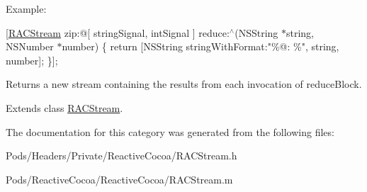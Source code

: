 Example\+:

\mbox{[}\mbox{\hyperlink{interface_r_a_c_stream}{R\+A\+C\+Stream}} zip\+:@\mbox{[} string\+Signal, int\+Signal \mbox{]} reduce\+:$^\wedge$(N\+S\+String $\ast$string, N\+S\+Number $\ast$number) \{ return \mbox{[}N\+S\+String string\+With\+Format\+:"\%@\+: \%", string, number\mbox{]}; \}\mbox{]};

Returns a new stream containing the results from each invocation of {\ttfamily reduce\+Block}. 

Extends class \mbox{\hyperlink{interface_r_a_c_stream_aba7b1d8c9ac130afad52b0baca8ae016}{R\+A\+C\+Stream}}.



The documentation for this category was generated from the following files\+:\begin{DoxyCompactItemize}
\item 
Pods/\+Headers/\+Private/\+Reactive\+Cocoa/R\+A\+C\+Stream.\+h\item 
Pods/\+Reactive\+Cocoa/\+Reactive\+Cocoa/R\+A\+C\+Stream.\+m\end{DoxyCompactItemize}
